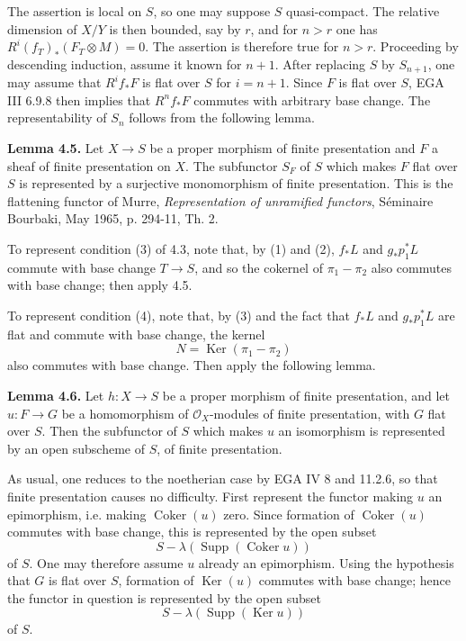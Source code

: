 \documentclass[11pt]{article}
\providecommand{\Coker}{\operatorname{Coker}}
\providecommand{\Ker}{\operatorname{Ker}}
\providecommand{\Supp}{\operatorname{Supp}}
\begin{document}
The assertion is local on \(S\), so one may suppose \(S\) quasi-compact. The relative dimension of \(X/Y\) is then bounded, say by \(r\), and for \(n>r\) one has \(R^i(f_T)_*(F_T\otimes M)=0\). The assertion is therefore true for \(n>r\). Proceeding by descending induction, assume it known for \(n+1\). After replacing \(S\) by \(S_{n+1}\), one may assume that \(R^if_*F\) is flat over \(S\) for \(i=n+1\). Since \(F\) is flat over \(S\), EGA III 6.9.8 then implies that \(R^nf_*F\) commutes with arbitrary base change. The representability of \(S_n\) follows from the following lemma.

\textbf{Lemma 4.5.} Let \(X\to S\) be a proper morphism of finite presentation and \(F\) a sheaf of finite presentation on \(X\). The subfunctor \(S_F\) of \(S\) which makes \(F\) flat over \(S\) is represented by a surjective monomorphism of finite presentation. This is the flattening functor of Murre, \emph{Representation of unramified functors}, Séminaire Bourbaki, May 1965, p. 294-11, Th. 2.

To represent condition (3) of 4.3, note that, by (1) and (2), \(f_*L\) and \(g_*p_1^*L\) commute with base change \(T\to S\), and so the cokernel of \(\pi_1-\pi_2\) also commutes with base change; then apply 4.5.

To represent condition (4), note that, by (3) and the fact that \(f_*L\) and \(g_*p_1^*L\) are flat and commute with base change, the kernel
\[
  N=\Ker(\pi_1-\pi_2)
\]
also commutes with base change. Then apply the following lemma.

\textbf{Lemma 4.6.} Let \(h:X\to S\) be a proper morphism of finite presentation, and let \(u:F\to G\) be a homomorphism of \(\mathcal O_X\)-modules of finite presentation, with \(G\) flat over \(S\). Then the subfunctor of \(S\) which makes \(u\) an isomorphism is represented by an open subscheme of \(S\), of finite presentation.

As usual, one reduces to the noetherian case by EGA IV 8 and 11.2.6, so that finite presentation causes no difficulty. First represent the functor making \(u\) an epimorphism, i.e. making \(\Coker(u)\) zero. Since formation of \(\Coker(u)\) commutes with base change, this is represented by the open subset
\[
  S-\lambda(\Supp(\Coker u))
\]
of \(S\). One may therefore assume \(u\) already an epimorphism. Using the hypothesis that \(G\) is flat over \(S\), formation of \(\Ker(u)\) commutes with base change; hence the functor in question is represented by the open subset
\[
  S-\lambda(\Supp(\Ker u))
\]
of \(S\).
\end{document}

